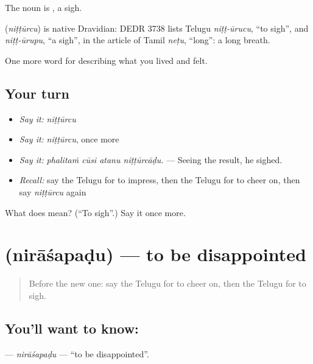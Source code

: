 The noun is , a sigh.

\begin{cousinweb}
\textbf{} (\emph{niṭṭūrcu}) is native Dravidian: DEDR 3738 lists Telugu \emph{niṭṭ-ūrucu}, \textquotedblleft{}to sigh\textquotedblright{}, and \emph{niṭṭ-ūrupu}, \textquotedblleft{}a sigh\textquotedblright{}, in the article of Tamil \emph{neṭu}, \textquotedblleft{}long\textquotedblright{}: a long breath.
\end{cousinweb}

\begin{grammarlens}[title={What you've built}]
One more word for describing what you lived and felt.
\end{grammarlens}

\subsection*{Your turn}
\begin{itemize}
\raggedright
  \item \emph{Say it:} \emph{niṭṭūrcu}
  \item \emph{Say it:} \emph{niṭṭūrcu}, once more
  \item \emph{Say it:} \emph{phalitaṁ cūsi atanu niṭṭūrcāḍu.} — Seeing the result, he sighed.
  \item \emph{Recall:} say the Telugu for to impress, then the Telugu for to cheer on, then say \emph{niṭṭūrcu} again
\end{itemize}

\begin{tcolorbox}[breakable,colback=teal!4,colframe=teal!35!black,title={Before you move on}]
What does  mean? (\textquotedblleft{}To sigh\textquotedblright{}.) Say it once more.
\end{tcolorbox}
\section[\texorpdfstring{\te{నిరాశపడు} (nirāśapaḍu)}{నిరాశపడు (nirāśapaḍu)}]{ (nirāśapaḍu) — to be disappointed}

\label{lesson:TE-C502-nirasapadu}



\begin{quote}
Before the new one: say the Telugu for to cheer on, then the Telugu for to sigh.
\end{quote}

\subsection*{You'll want to know: }
\textbf{} — \emph{nirāśapaḍu} — \textquotedblleft{}to be disappointed\textquotedblright{}.

